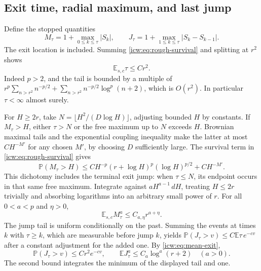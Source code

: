 \documentclass[11pt,letterpaper]{article}
\theoremstyle{remark}\newtheorem{remark}[theorem]{Remark}
\newcommand{\Prob}{\mathbb P}
\newcommand{\E}{\mathbb E}
\newcommand{\1}{\mathbf1}
\begin{document}
\subsection{Exit time, radial maximum, and last jump}
Define the stopped quantities
\[
 M_\tau=1+\max_{0\le k\le\tau}|S_k|,\qquad
 J_\tau=1+\max_{1\le k\le\tau}|S_k-S_{k-1}|.
\]
The exit location is included. Summing \eqref{icw:eq:rough-survival} and
splitting at $r^2$ shows
\begin{equation}\label{icw:eq:mean-exit}
 \E_{s,c}\tau\le Cr^2.
\end{equation}
Indeed $p>2$, and the tail is bounded by a multiple of
$r^p\sum_{n>r^2}n^{-p/2}+
\sum_{n>r^2}n^{-p/2}\log^p(n+2)$, which is $O(r^2)$.
In particular $\tau<\infty$ almost surely.

For $H\ge2r$, take $N=\lfloor H^2/(D\log H)\rfloor$, adjusting
bounded $H$ by constants. If $M_\tau>H$, either $\tau>N$ or the
free maximum up to $N$ exceeds $H$. Brownian maximal tails and the
exponential coupling inequality make the latter at most $C H^{-M'}$
for any chosen $M'$, by choosing $D$ sufficiently large. The survival
term in \eqref{icw:eq:rough-survival} gives
\begin{equation}\label{icw:eq:radial-tail}
 \Prob(M_\tau>H)\le
 C H^{-p}(r+\log H)^p(\log H)^{p/2}+C H^{-M'}.
\end{equation}
This dichotomy includes the terminal exit jump: when $\tau\le N$,
its endpoint occurs in that same free maximum. Integrate against
$aH^{a-1}\,dH$, treating $H\le2r$ trivially and absorbing logarithms
into an arbitrary small power of $r$. For all $0<a<p$ and $\eta>0$,
\begin{equation}\label{icw:eq:radial-moment}
 \E_{s,c}M_\tau^a\le C_{a,\eta}r^{a+\eta}.
\end{equation}
The jump tail is uniform conditionally on the past. Summing the events
at times $k$ with $\tau\ge k$, which are measurable before jump $k$,
yields $\Prob(J_\tau>v)\le C\E\tau\,e^{-cv}$ after a constant
adjustment for the added one. By \eqref{icw:eq:mean-exit},
\begin{equation}\label{icw:eq:jump-moment}
 \Prob(J_\tau>v)\le Cr^2e^{-cv},\qquad
 \E J_\tau^a\le C_a\log^a(r+2)\quad(a>0).
\end{equation}
The second bound integrates the minimum of the displayed tail and one.
\end{document}
